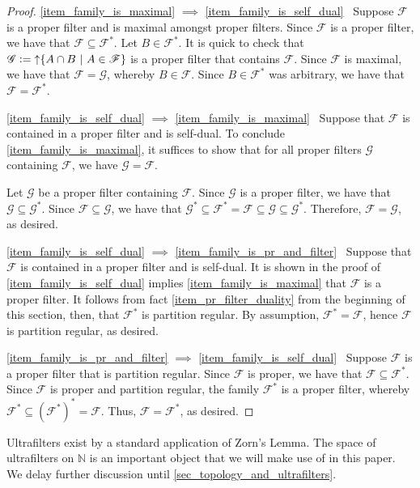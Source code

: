 \documentclass[letter,11pt]{article}
\theoremstyle{plain}
\theoremstyle{definition}
\theoremstyle{plain}
\theoremstyle{plain}
\numberwithin{equation}{section}
\newcommand{\N}{\mathbb{N}}
\newcommand{\defeq}{\vcentcolon=}
\DeclareMathOperator{\upclose}{\uparrow}
\newcommand{\family}{\mathscr{F}}
\newcommand{\familytwo}{\mathscr{G}}
\begin{document}
\begin{proof}
    \eqref{item_family_is_maximal} $\implies$ \eqref{item_family_is_self_dual} \ Suppose $\family$ is a proper filter and is maximal amongst proper filters.  Since $\family$ is a proper filter, we have that $\family \subseteq \family^*$.  Let $B \in \family^*$.  It is quick to check that $\familytwo \defeq \upclose \{A \cap B \ | \ A \in \family \}$ is a proper filter that contains $\family$.  Since $\family$ is maximal, we have that $\family = \familytwo$, whereby $B \in \family$.  Since $B \in \family^*$ was arbitrary, we have that $\family = \family^*$.

    \eqref{item_family_is_self_dual} $\implies$ \eqref{item_family_is_maximal} \ Suppose that $\family$ is contained in a proper filter and is self-dual. To conclude \eqref{item_family_is_maximal}, it suffices to show that for all proper filters $\familytwo$ containing $\family$, we have $\familytwo = \family$.
    
    Let $\familytwo$ be a proper filter containing $\family$. Since $\familytwo$ is a proper filter, we have that $\familytwo \subseteq \familytwo^*$.  Since $\family \subseteq \familytwo$, we have that $\familytwo^* \subseteq \family^* = \family \subseteq \familytwo \subseteq \familytwo^*$.  Therefore, $\family = \familytwo$, as desired.

    \eqref{item_family_is_self_dual} $\implies$ \eqref{item_family_is_pr_and_filter} \ Suppose that $\family$ is contained in a proper filter and is self-dual.  It is shown in the proof of \eqref{item_family_is_self_dual} implies \eqref{item_family_is_maximal} that $\family$ is a proper filter. It follows from fact \eqref{item_pr_filter_duality} from the beginning of this section, then, that $\family^*$ is partition regular.  By assumption, $\family^* = \family$, hence $\family$ is partition regular, as desired.

    \eqref{item_family_is_pr_and_filter} $\implies$ \eqref{item_family_is_self_dual} \ Suppose $\family$ is a proper filter that is partition regular.  Since $\family$ is proper, we have that $\family \subseteq \family^*$.  Since $\family$ is proper and partition regular, the family $\family^*$ is a proper filter, whereby $\family^* \subseteq (\family^*)^* = \family$.  Thus, $\family = \family^*$, as desired.
\end{proof}

Ultrafilters exist by a standard application of Zorn's Lemma.  The space of ultrafilters on $\N$ is an important object that we will make use of in this paper.  We delay further discussion until \cref{sec_topology_and_ultrafilters}.
\end{document}

